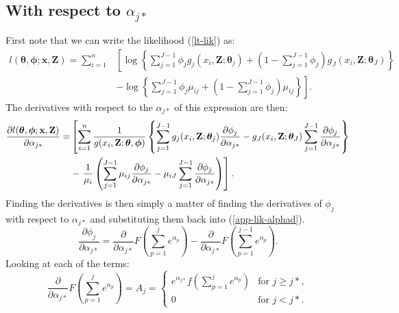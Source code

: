 \subsection{With respect to $\alpha_{j*}$}

First note that we can write the likelihood (\ref{lt-lik}) as:
\begin{align*}
l(\bm{\theta},\bm{\phi}; \mathbf{x},\mathbf{Z}) = \sum_{i=1}^n  & \left [ \log \left \{ \sum_{j=1}^{J-1} \phi_j g_j(x_i,\mathbf{Z}; \bm{\theta}_j) + \left (1-\sum_{j=1}^{J-1} \phi_j \right ) g_J(x_i,\mathbf{Z}; \bm{\theta}_J) \right \} \right. \\
& \left. - \log \left \{ \sum_{j=1}^{J-1} \phi_j \mu_{ij} + \left (1-\sum_{j=1}^{J-1} \phi_j \right ) \mu_{ij}  \right \} \right ].
\end{align*}
The derivatives with respect to the $\alpha_{j*}$ of this expression are then:
\begin{align}
\frac{\partial l(\bm{\theta},\bm{\phi}; \mathbf{x},\mathbf{Z})}{\partial \alpha_{j*}} = & \left [ \sum_{i=1}^n \frac{1}{g(x_i,\mathbf{Z}; \bm{\theta},\bm{\phi})} \left \{ \sum_{j=1}^{J-1} g_j(x_i,\mathbf{Z}; \bm{\theta}_j) \frac{\partial \phi_j}{\partial \alpha_{j*}}  -g_J(x_i,\mathbf{Z}; \bm{\theta}_J) \sum_{j=1}^{J-1}  \frac{\partial \phi_j}{\partial \alpha_{j*}} \right \} \right. \notag \\
&- \left. \frac{1}{\mu_i} \left (\sum_{j=1}^{J-1} \mu_{ij} \frac{\partial \phi_j}{\partial \alpha_{j*}} - \mu_{iJ} \sum_{j=1}^{J-1}   \frac{\partial \phi_j}{\partial \alpha_{j*}} \right ) \right ]. \label{app-lik-alphad}
\end{align}
Finding the derivatives is then simply a matter of finding the derivatives of $\phi_{j}$ with respect to $\alpha_{j*}$ and substituting them back into (\ref{app-lik-alphad}).
\begin{equation*}
\frac{\partial \phi_j}{\partial \alpha_{j*}} = \frac{\partial}{\partial \alpha_{j*}}F \left (\sum_{p=1}^j e^{\alpha_p} \right ) - \frac{\partial}{\partial \alpha_{j*}} F \left (\sum_{p=1}^{j-1} e^{\alpha_p} \right ).
\end{equation*}
Looking at each of the terms:
\begin{equation*}
\frac{\partial}{\partial \alpha_{j*}} F \left (\sum_{p=1}^j e^{\alpha_p} \right )=A_{j}=\begin{cases}
e^{\alpha_{j*}}f \left (\sum_{p=1}^j e^{\alpha_p} \right )& \text{for $j\geq j*$},\\
0 & \text{for $j<j*$}.
\end{cases}
\end{equation*}
